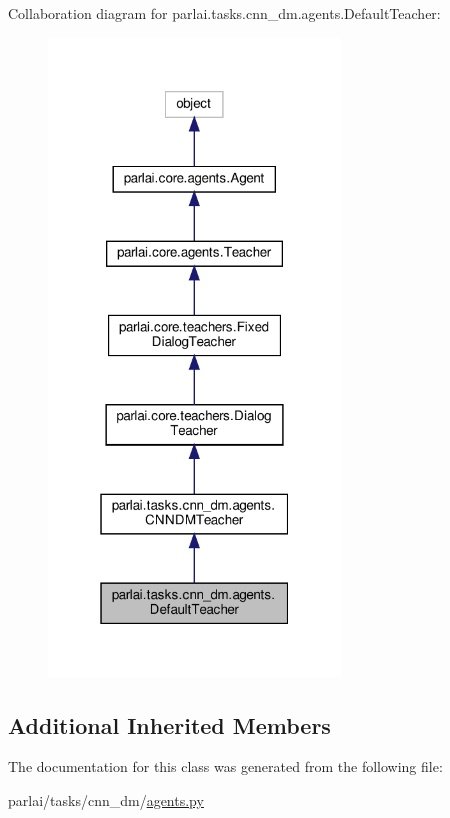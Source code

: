 Collaboration diagram for parlai.\+tasks.\+cnn\+\_\+dm.\+agents.\+Default\+Teacher\+:
\nopagebreak
\begin{figure}[H]
\begin{center}
\leavevmode
\includegraphics[width=220pt]{classparlai_1_1tasks_1_1cnn__dm_1_1agents_1_1DefaultTeacher__coll__graph}
\end{center}
\end{figure}
\subsection*{Additional Inherited Members}


The documentation for this class was generated from the following file\+:\begin{DoxyCompactItemize}
\item 
parlai/tasks/cnn\+\_\+dm/\hyperlink{parlai_2tasks_2cnn__dm_2agents_8py}{agents.\+py}\end{DoxyCompactItemize}
